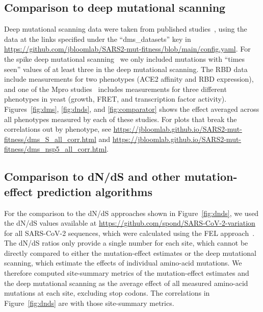 \documentclass[9pt,twocolumn,twoside]{gsajnl_modified}
\begin{document}
{\subsection{Comparison to deep mutational scanning}
Deep mutational scanning data were taken from published studies~\citep{dadonaite2023pseudovirus,starr2022deep,flynn2022,flynn2023,iketani2022functional}, using the data at the links specified under the ``dms\_datasets'' key in \url{https://github.com/jbloomlab/SARS2-mut-fitness/blob/main/config.yaml}.
For the spike deep mutational scanning~\citep{dadonaite2023pseudovirus} we only included mutations with ``times seen'' values of at least three in the deep mutational scanning.
The RBD data~\citep{starr2022deep} include measurements for two phenotypes (ACE2 affinity and RBD expression), and one of the Mpro studies~\citep{flynn2022} includes measurements for three different phenotypes in yeast (growth, FRET, and transcription factor activity).
Figures~\ref{fig:dms}, \ref{fig:dnds}, and \ref{fig:comparator} shows the effect averaged across all phenotypes measured by each of these studies.
For plots that break the correlations out by phenotype, see \url{https://jbloomlab.github.io/SARS2-mut-fitness/dms_S_all_corr.html} and \url{https://jbloomlab.github.io/SARS2-mut-fitness/dms_nsp5_all_corr.html}.

\subsection{Comparison to dN/dS and other mutation-effect prediction algorithms}
For the comparison to the dN/dS approaches shown in Figure~\ref{fig:dnds}, we used the dN/dS values available at \url{https://github.com/spond/SARS-CoV-2-variation}~\cite{martin2021emergence} for all SARS-CoV-2 sequences, which were calculated using the FEL approach~\cite{kosakovsky2005not}.
The dN/dS ratios only provide a single number for each site, which cannot be directly compared to either the mutation-effect estimates or the deep mutational scanning, which estimate the effects of individual amino-acid mutations.
We therefore computed site-summary metrics of the mutation-effect estimates and the deep mutational scanning as the average effect of all measured amino-acid mutations at each site, excluding stop codons.
The correlations in Figure~\ref{fig:dnds} are with those site-summary metrics.

}
\end{document}
